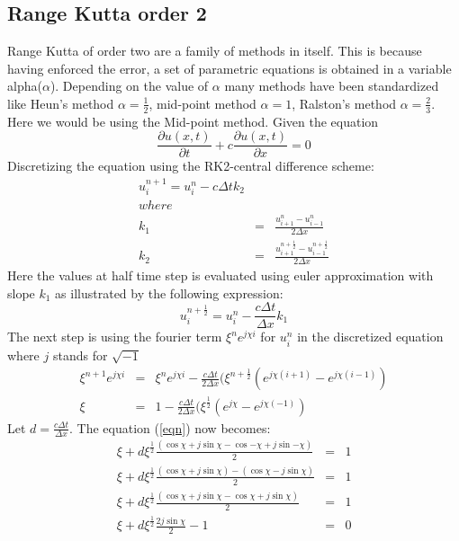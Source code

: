 \documentclass[a4paper,12pt]{report}
\begin{document}
\subsection{Range Kutta order 2}
Range Kutta of order two are a family of methods in itself. This is because having enforced the error, a set of parametric equations is obtained in a variable alpha($\alpha$). Depending on the value of $\alpha$ many methods have been standardized like Heun's method $\alpha=\frac{1}{2}$, mid-point method $\alpha=1$, Ralston's method $\alpha=\frac{2}{3}$. Here we would be using the Mid-point method.
Given the equation
\[\frac{\partial u(x,t)}{\partial t}+c\frac{\partial u(x,t)}{\partial x} = 0 \]
Discretizing the equation using the RK2-central difference scheme:
\begin{eqnarray}
u^{n+1}_{i} = u^{n}_{i} - c\Delta t k_2 \label{ctdeqn}\\ 
where \nonumber \\
k_1 &=& \frac{u_{i+1}^{n} -u_{i-1}^{n}}{2\Delta x} \nonumber \\
k_2 &=& \frac{u_{i+1}^{n+\frac{1}{2}} -u_{i-1}^{n+\frac{1}{2}}}{2\Delta x} \nonumber
\end{eqnarray}
Here the values at half time step is evaluated using euler approximation with slope $k_1$ as illustrated by the following expression:
\[u_{i}^{n+\frac{1}{2}} = u_{i}^{n} - \frac{c\Delta t}{\Delta x}k_1 \]
The next step is using the fourier term $\xi^{n}e^{j\chi i}$ for $u^{n}_{i}$ in the discretized equation where $j$ stands for $\sqrt{-1}$
\begin{eqnarray}
\xi^{n+1}e^{j\chi i} &=& \xi^{n}e^{j\chi i} -\frac{c\Delta t}{2\Delta x}(\xi^{n+\frac{1}{2}}(e^{j\chi(i+1)}-e^{j\chi(i-1)}) \label{eqn}\\
\xi&=& 1 -\frac{c\Delta t}{2\Delta x}(\xi^{\frac{1}{2}}(e^{j\chi}-e^{j\chi(-1)}) \nonumber
\end{eqnarray}
Let $d=\frac{c\Delta t}{\Delta x}$. The equation (\ref{eqn}) now becomes:
\begin{eqnarray}
\xi + d \xi^{\frac{1}{2}}\frac{(\cos{\chi}+j\sin{\chi} - \cos{-\chi}+j\sin{-\chi})}{2} &=& 1 \nonumber \\
\xi + d \xi^{\frac{1}{2}}\frac{(\cos{\chi}+j\sin{\chi}) - (\cos{\chi}-j\sin{\chi})}{2} &=& 1 \nonumber \\
\xi + d \xi^{\frac{1}{2}}\frac{(\cos{\chi}+j\sin{\chi} - \cos{\chi}+j\sin{\chi})}{2}&=&1\nonumber \\
\xi + d \xi^{\frac{1}{2}}\frac{2j\sin{\chi}}{2}-1&=&0
\end{eqnarray}
\end{document}
